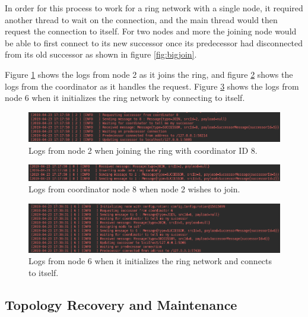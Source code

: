 \documentclass[12pt]{article}
\begin{document}
In order for this process to work for a ring network with a single node,
it required another thread to wait on the connection, and the main thread
would then request the connection to itself. For two nodes and more the
joining node would be able to first connect to its new successor once its
predecessor had disconnected from its old successor as shown in figure \ref{fig:bigjoin}. 

Figure \ref{fig:succreq} shows the logs from node 2 as it joins the ring, and figure \ref{fig:succreqcoord} shows the logs from the coordinator as it handles the request. Figure \ref{fig:singlenodejoin} shows the logs from node 6 when it initializes the ring network by connecting to itself.

\begin{figure}[!ht]
	\centering
	\includegraphics[width=\linewidth]{images/succreq}
	\caption{Logs from node 2 when joining the ring with coordinator ID 8.}
	\label{fig:succreq}
\end{figure}

\begin{figure}[!ht]
	\centering
	\includegraphics[width=\linewidth]{images/succreqcoord}
	\caption{Logs from coordinator node 8 when node 2 wishes to join.}
	\label{fig:succreqcoord}
\end{figure}

\begin{figure}[!ht]
	\centering
	\includegraphics[width=\linewidth]{images/singlenodejoin}
	\caption{Logs from node 6 when it initializes the ring network and connects to itself.}
	\label{fig:singlenodejoin}
\end{figure}

\subsection{Topology Recovery and Maintenance}
\end{document}
